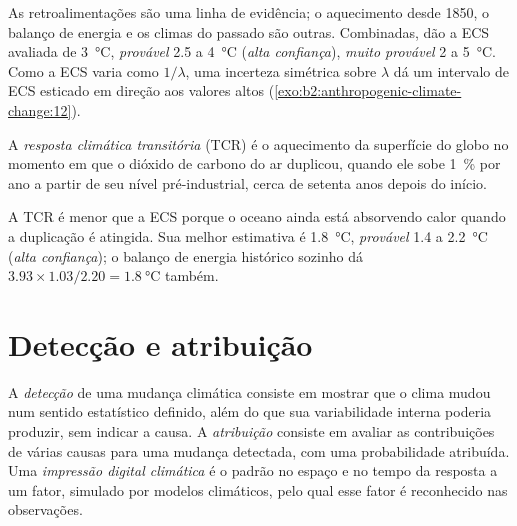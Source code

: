 As retroalimentações são uma linha de evidência; o aquecimento desde 1850, o balanço de energia e os climas
do passado são outras. Combinadas, dão a ECS avaliada de \qty{3}{\celsius}, \emph{provável}
2.5 a \qty{4}{\celsius} (\emph{alta confiança}), \emph{muito provável} 2 a \qty{5}{\celsius}.
Como a ECS varia como $1/\lambda$, uma incerteza simétrica sobre $\lambda$ dá um intervalo
de ECS esticado em direção aos valores altos (\cref{exo:b2:anthropogenic-climate-change:12}).

\begin{definition}\label{def:b2:anthropogenic-climate-change:tcr}
A \emph{resposta climática transitória} (TCR) é o aquecimento da superfície
do globo no momento em que o dióxido de carbono do ar duplicou, quando ele sobe \qty{1}{\percent}
por ano a partir de seu nível pré-industrial, cerca de setenta anos depois do início.
\end{definition}

A TCR é menor que a ECS porque o oceano ainda está absorvendo calor quando a duplicação é
atingida. Sua melhor estimativa é \qty{1.8}{\celsius}, \emph{provável} 1.4 a \qty{2.2}{\celsius}
(\emph{alta confiança}); o balanço de energia histórico sozinho dá $3.93 \times 1.03/2.20 =
\qty{1.8}{\celsius}$ também.

\section{Detecção e atribuição}\label{sec:b2:anthropogenic-climate-change:attribution}

\begin{definition}\label{def:b2:anthropogenic-climate-change:da}
A \emph{detecção} de uma mudança climática consiste em mostrar que o
clima mudou num sentido estatístico definido, além do que sua variabilidade interna poderia
produzir, sem indicar a causa. A \emph{atribuição} consiste em avaliar as
contribuições de várias causas para uma mudança detectada, com uma probabilidade atribuída. Uma \emph{impressão
digital climática} é o padrão no espaço e no tempo da resposta a um
fator, simulado por modelos climáticos, pelo qual esse fator é reconhecido nas observações.
\end{definition}

